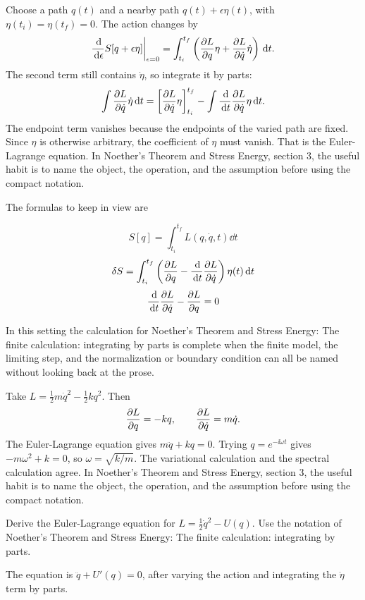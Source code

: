Choose a path \(q(t)\) and a nearby path \(q(t)+\epsilon\eta(t)\), with \(\eta(t_i)=\eta(t_f)=0\).  The action changes by
\[
  \frac{\,\mathrm d}{\,\mathrm d\epsilon}S[q+\epsilon\eta]\bigg|_{\epsilon=0}
  =
  \int_{t_i}^{t_f}
  \left(
  \frac{\partial L}{\partial q}\eta+\frac{\partial L}{\partial\dot q}\dot\eta
  \right)\,\mathrm d t.
\]
The second term still contains \(\dot\eta\), so integrate it by parts:
\[
  \int \frac{\partial L}{\partial\dot q}\dot\eta\,\mathrm d t
  =
  \left[\frac{\partial L}{\partial\dot q}\eta\right]_{t_i}^{t_f}
  -
  \int \frac{\,\mathrm d}{\,\mathrm d t}\frac{\partial L}{\partial\dot q}\eta\,\mathrm d t.
\]
The endpoint term vanishes because the endpoints of the varied path are fixed.  Since \(\eta\) is otherwise arbitrary, the coefficient of \(\eta\) must vanish.  That is the Euler-Lagrange equation.  In Noether's Theorem and Stress Energy, section 3, the useful habit is to name the object, the operation, and the assumption before using the compact notation.

The formulas to keep in view are

\[
  S[q]=\int_{t_i}^{t_f}L(q,\dot q,t)\dd t
\]
\[
  \delta S=\int_{t_i}^{t_f}\left(\frac{\partial L}{\partial q}-\frac{\,\mathrm d}{\,\mathrm d t}\frac{\partial L}{\partial\dot q}\right)\eta(t)\,\mathrm d t
\]
\[
  \frac{\,\mathrm d}{\,\mathrm d t}\frac{\partial L}{\partial\dot q}-\frac{\partial L}{\partial q}=0
\]

In this setting the calculation for Noether's Theorem and Stress Energy: The finite calculation: integrating by parts is complete when the finite model, the limiting step, and the normalization or boundary condition can all be named without looking back at the prose.




\begin{example}
Take \(L=\frac12m\dot q^2-\frac12kq^2\).  Then
\[
  \frac{\partial L}{\partial q}=-kq,\qquad \frac{\partial L}{\partial\dot q}=m\dot q.
\]
The Euler-Lagrange equation gives \(m\ddot q+kq=0\).  Trying \(q=e^{-\ii\omega t}\) gives \(-m\omega^2+k=0\), so \(\omega=\sqrt{k/m}\).  The variational calculation and the spectral calculation agree.  In Noether's Theorem and Stress Energy, section 3, the useful habit is to name the object, the operation, and the assumption before using the compact notation.
\end{example}



\begin{exercise}
Derive the Euler-Lagrange equation for \(L=\frac12\dot q^2-U(q)\).  Use the notation of Noether's Theorem and Stress Energy: The finite calculation: integrating by parts.
\begin{answer}
The equation is \(\ddot q+U'(q)=0\), after varying the action and integrating the \(\dot\eta\) term by parts.
\end{answer}
\end{exercise}

